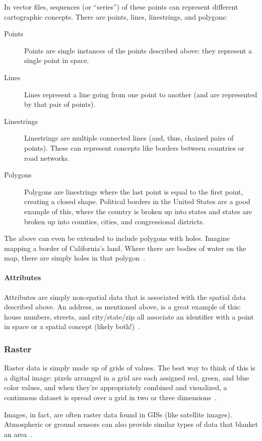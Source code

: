 In vector files, sequences (or ``series'') of these points can represent different cartographic concepts. There are points, lines, linestrings, and polygons:

\begin{description}
  \item[Points] Points are single instances of the points described above: they represent a single point in space.
  \item[Lines] Lines represent a line going from one point to another (and are represented by that pair of points).
  \item[Linestrings] Linestrings are multiple connected lines (and, thus, chained pairs of points). These can represent concepts like borders between countries or road networks.
  \item[Polygons] Polygons are linestrings where the last point is equal to the first point, creating a closed shape. Political borders in the United States are a good example of this, where the country is broken up into states and states are broken up into counties, cities, and congressional districts.
\end{description}

The above can even be extended to include polygons with holes. Imagine mapping a border of California's land. Where there are bodies of water on the map, there are simply holes in that polygon~\cite{gentle_intro}.

\paragraph{Attributes}
Attributes are simply non-spatial data that is associated with the spatial data described above. An address, as mentioned above, is a great example of this: house numbers, streets, and city/state/zip all associate an identifier with a point in space or a spatial concept (likely both!)~\cite{gentle_intro}.

\subsubsection{Raster}
Raster data is simply made up of grids of values. The best way to think of this is a digital image: pixels arranged in a grid are each assigned red, green, and blue color values, and when they're appropriately combined and visualized, a continuous dataset is spread over a grid in two or three dimensions~\cite{gentle_intro}.

Images, in fact, are often raster data found in GISs (like satellite images). Atmospheric or ground sensors can also provide similar types of data that blanket an area~\cite{gentle_intro}.

